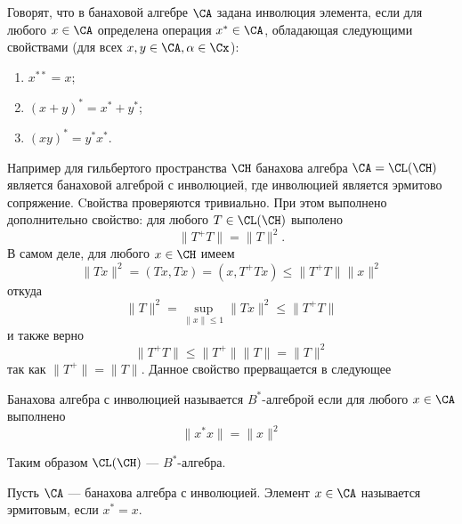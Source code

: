 \begin{definition}
	Говорят, что в банаховой алгебре $\CA$ задана инволюция элемента, если для любого $x \in \CA$ определена операция $x^* \in \CA$, обладающая следующими свойствами (для всех $x,y \in \CA, \alpha \in \Cx$):
	\begin{enumerate}
		\item $x^{**} = x$;
		\item $(x + y)^* = x^* + y^*$;
		\item $(xy)^* = y^*x^*$.
	\end{enumerate}
\end{definition}
Например для гильбертого пространства $\CH$ банахова алгебра $\CA=\CL(\CH)$ является банаховой алгеброй с инволюцией, где инволюцией является эрмитово сопряжение. Cвойства проверяются тривиально. При этом выполнено дополнительно свойство: для любого $T \in \CL(\CH)$ выполено
$$
\|T^{+} T\| = \|T\|^2.
$$
В самом деле, для любого $x \in \CH$ имеем
$$
\|Tx\|^2 = (Tx, Tx) = (x, T^{+}Tx) \leq \|T^{+}T\| \|x\|^2
$$
откуда
$$
\|T\|^2 = \sup_{\|x\|\leq 1}\|Tx\|^2 \leq \|T^{+}T\| 
$$
и также верно 
$$
\|T^{+}T\| \leq \|T^{+}\|\|T\| = \|T\|^2
$$
так как $\|T^{+}\| = \|T\|$. Данное свойство прерващается в следующее 
\begin{definition}
	Банахова алгебра с инволюцией называется $B^*$-алгеброй если для любого $x \in \CA$ выполнено 
	$$
	\|x^*x\| = \|x\|^2
	$$
\end{definition}
Таким образом $\CL(\CH)$ --- $B^*$-алгебра.
\begin{definition}
	Пусть $\CA$ --- банахова алгебра с инволюцией. Элемент $x \in \CA$ называется эрмитовым, если $x^* = x$. 
\end{definition}